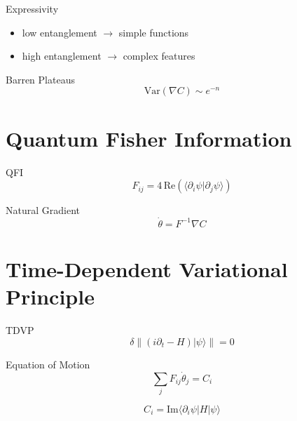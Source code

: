 \documentclass{beamer}
\begin{document}

\begin{frame}{Expressivity}
\begin{itemize}
\item low entanglement $\rightarrow$ simple functions
\item high entanglement $\rightarrow$ complex features
\end{itemize}
\end{frame}


\begin{frame}{Barren Plateaus}
\[
\mathrm{Var}(\nabla C) \sim e^{-n}
\]
\end{frame}

\section{Quantum Fisher Information}

\begin{frame}{QFI}
\[
F_{ij} = 4\,\mathrm{Re}(\langle \partial_i \psi | \partial_j \psi\rangle)
\]
\end{frame}


\begin{frame}{Natural Gradient}
\[
\dot{\theta} = F^{-1} \nabla C
\]
\end{frame}

\section{Time-Dependent Variational Principle}

\begin{frame}{TDVP}
\[
\delta \| (i\partial_t - H)|\psi\rangle \| = 0
\]
\end{frame}


\begin{frame}{Equation of Motion}
\[
\sum_j F_{ij} \dot{\theta}_j = C_i
\]

\[
C_i = \mathrm{Im}\langle \partial_i \psi | H | \psi\rangle
\]
\end{frame}
\end{document}
